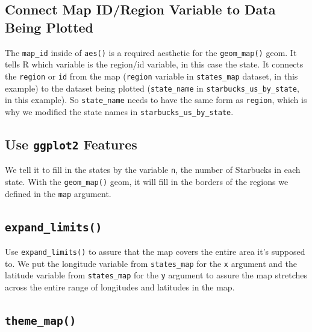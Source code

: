 \documentclass[
  letterpaper,
  DIV=11,
  numbers=noendperiod]{scrreprt}
\begin{document}
\subsection*{Connect Map ID/Region Variable to Data Being
Plotted}\label{connect-map-idregion-variable-to-data-being-plotted}

The \texttt{map\_id} inside of \texttt{aes()} is a required aesthetic
for the \texttt{geom\_map()} geom. It tells R which variable is the
region/id variable, in this case the state. It connects the
\texttt{region} or \texttt{id} from the map (\texttt{region} variable in
\texttt{states\_map} dataset, in this example) to the dataset being
plotted (\texttt{state\_name} in \texttt{starbucks\_us\_by\_state}, in
this example). So \texttt{state\_name} needs to have the same form as
\texttt{region}, which is why we modified the state names in
\texttt{starbucks\_us\_by\_state}.

\subsection*{\texorpdfstring{Use \texttt{ggplot2}
Features}{Use ggplot2 Features}}\label{use-ggplot2-features}

We tell it to fill in the states by the variable \texttt{n}, the number
of Starbucks in each state. With the \texttt{geom\_map()} geom, it will
fill in the borders of the regions we defined in the \texttt{map}
argument.

\subsection*{\texorpdfstring{\texttt{expand\_limits()}}{expand\_limits()}}\label{expand_limits}

Use \texttt{expand\_limits()} to assure that the map covers the entire
area it's supposed to. We put the longitude variable from
\texttt{states\_map} for the \texttt{x} argument and the latitude
variable from \texttt{states\_map} for the \texttt{y} argument to assure
the map stretches across the entire range of longitudes and latitudes in
the map.

\subsection*{\texorpdfstring{\texttt{theme\_map()}}{theme\_map()}}\label{theme_map}
\end{document}
